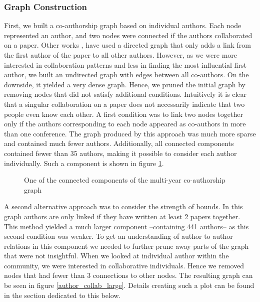\documentclass[article,twocolumn]{IEEEtran}
\begin{document}
\hypertarget{graph-construction}{%
\subsubsection{Graph Construction}\label{graph-construction}}

First, we built a co-authorship graph based on individual authors. Each
node represented an author, and two nodes were connected if the authors
collaborated on a paper. Other works \cite{cheong2009social},
\cite{hesford2006management} have used a directed graph that only adds a
link from the first author of the paper to all other authors. However,
as we were more interested in collaboration patterns and less in finding
the most influential first author, we built an undirected graph with
edges between all co-authors. On the downside, it yielded a very dense
graph. Hence, we pruned the initial graph by removing nodes that did not
satisfy additional conditions. Intuitively it is clear that a singular
collaboration on a paper does not necessarily indicate that two people
even know each other. A first condition was to link two nodes together
only if the authors corresponding to each node appeared as co-authors in
more than one conference. The graph produced by this approach was much
more sparse and contained much fewer authors. Additionally, all
connected components contained fewer than 35 authors, making it possible
to consider each author individually. Such a component is shown in
figure \ref{fig_plot}.


    \begin{figure}
        \begin{center}\end{center}
        \caption{One of the connected components of the multi-year co-authorship graph}
        \label{fig_plot}
    \end{figure}
    
    A second alternative approach was to consider the strength of bounds. In
this graph authors are only linked if they have written at least 2
papers together. This method yielded a much larger component
--containing 441 authors-- as this second condition was weaker. To get
an understanding of author to author relations in this component we
needed to further prune away parts of the graph that were not
insightful. When we looked at individual author within the community, we
were interested in collaborative individuals. Hence we removed nodes
that had fewer than 3 connections to other nodes. The resulting graph
can be seen in figure \ref{author_collab_large}. Details creating such a
plot can be found in the section dedicated to this below.
\end{document}
